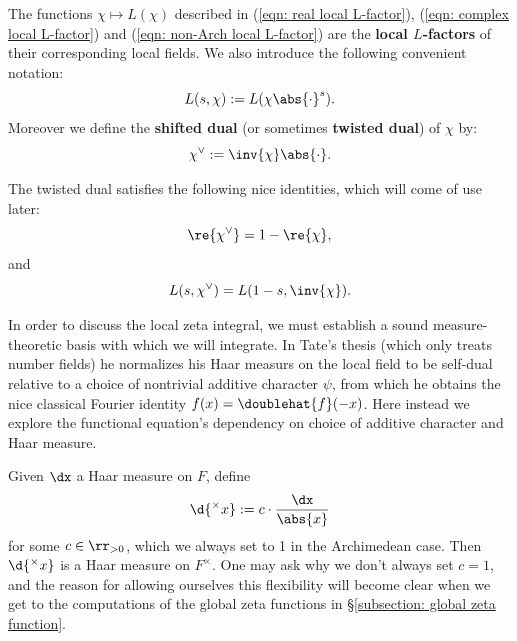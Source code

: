 \documentclass[11pt, x11names, openany]{book}
\begin{document}
\begin{defn}
\label{def: shifted dual and L(s, chi) notation}
    The functions $\chi \mapsto L(\chi)$ described in (\ref{eqn: real local L-factor}), (\ref{eqn: complex local L-factor}) and (\ref{eqn: non-Arch local L-factor}) are the \textbf{local $L$-factors} of their corresponding local fields. We also introduce the following convenient notation:
    \begin{equation*}
        L(s, \chi) := L(\chi \abs{\cdot}^s).
    \end{equation*}
    Moreover we define the \textbf{shifted dual} (or sometimes \textbf{twisted dual}) of $\chi$ by:
    \begin{equation*}
        \chi^\lor := \inv{\chi}\abs{\cdot}.
    \end{equation*}
\end{defn}

\begin{observation}
The twisted dual satisfies the following nice identities, which will come of use later:
\begin{equation*}
    \re{\chi^\lor} = 1 - \re{\chi},
\end{equation*}
and
\begin{equation*}
    L(s, \chi^\lor) = L(1-s, \inv{\chi}).
\end{equation*} 
\end{observation}

In order to discuss the local zeta integral, we must establish a sound measure-theoretic basis with which we will integrate. In Tate's thesis (which only treats number fields) he normalizes his Haar measurs on the local field to be self-dual relative to a choice of nontrivial additive character $\psi$, from which he obtains the nice classical Fourier identity $f(x) = \doublehat{f}(-x)$. Here instead we explore the functional equation's dependency on choice of additive character and Haar measure.

Given $\dx$ a Haar measure on $F$, define 
\begin{equation}
\label{eqn: measure on F^times}
    \d{^\times x} := c \cdot \frac{\dx}{\abs{x}}
\end{equation}
for some $c \in \rr_{> 0}$, which we always set to 1 in the Archimedean case. Then $\d{^\times x}$ is a Haar measure on $F^\times$. One may ask why we don't always set $c = 1$, and the reason for allowing ourselves this flexibility will become clear when we get to the computations of the global zeta functions in \S \ref{subsection: global zeta function}.
\end{document}
